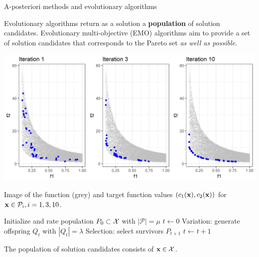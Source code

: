 \begin{frame}[allowframebreaks]{A-posteriori methods and evolutionary algorithms}

Evolutionary algorithms return as a solution a \textbf{population} of solution candidates. Evolutionary multi-objective (EMO) algorithms aim to provide a set of solution candidates that corresponds to the Pareto set \textit{as well as possible}.

\vspace*{-0.4cm}

\begin{center}
\includegraphics[width = 0.7\linewidth]{images/EA-steps.png}
\end{center}

\vspace*{-0.4cm}

\begin{footnotesize}
Image of the function (grey) and target function values $(c_1(\mathbf{x}), c_2(\mathbf{x}))$ for $\mathbf{x} \in \mathcal{P}_i, i = 1, 3, 10$.
\end{footnotesize}

\framebreak
\begin{algorithm}[H]
  \begin{center}
  \caption{Evolutionary algorithm}
      \begin{algorithmic}[1]
      \STATE Initialize and rate population $P_0 \subset \mathcal{X}$ with $|\mathcal{P}| = \mu$
      \STATE $t \leftarrow 0$
      \REPEAT
        \STATE Variation: generate offspring $Q_t$ with $|Q_t| = \lambda$
        \STATE Selection: select survivors $P_{t + 1}$
 		\STATE $t \leftarrow t + 1$
     \end{algorithmic}
    \end{center}
\end{algorithm}

The population of solution candidates consists of $\mathbf{x} \in \mathcal{X}$.

\end{frame}


